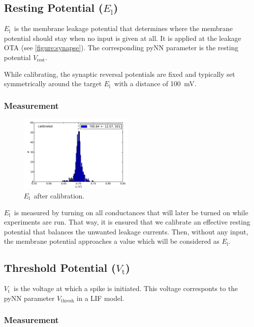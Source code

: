 \documentclass[12pt,a4paper,bibliography=totocnumbered,listof=totocnumbered, DIV12]{scrartcl}
\newcommand{\el}{\ensuremath{E_{\text{l}}}}
\newcommand{\vrest}{\ensuremath{V_{\text{rest}}}}
\newcommand{\vt}{\ensuremath{V_{\text{t}}}}
\begin{document}
\subsection{Resting Potential (\el)}
\el\ is the membrane leakage potential that determines where the membrane potential should stay when no input is given at all.
It is applied at the leakage OTA (see \cref{figure:synapse}).
The corresponding pyNN parameter is the resting potential \vrest.

While calibrating, the synaptic reversal potentials are fixed and typically set
symmetrically around the target \el\ with a distance of \SI{100}{\milli\volt}.

\subsubsection*{Measurement}

\begin{figure}
  \centering
  \includegraphics[width=0.5\textwidth]{figures/E_l_calibrated_without_defects}
  \caption{\el\ after calibration.}
  \label{fig:el_calibrated}
\end{figure}

\el\ is measured by turning on all conductances that will later be turned on while experiments are run.
That way, it is ensured that we calibrate an effective resting potential that balances the unwanted leakage currents.
Then, without any input, the membrane potential approaches a value which will be considered as \el.

\subsection{Threshold Potential (\vt)}
\vt\ is the voltage at which a spike is initiated.
This voltage corresponts to the pyNN parameter $V_{\text{thresh}}$ in a LIF model.

\subsubsection*{Measurement}
\end{document}
